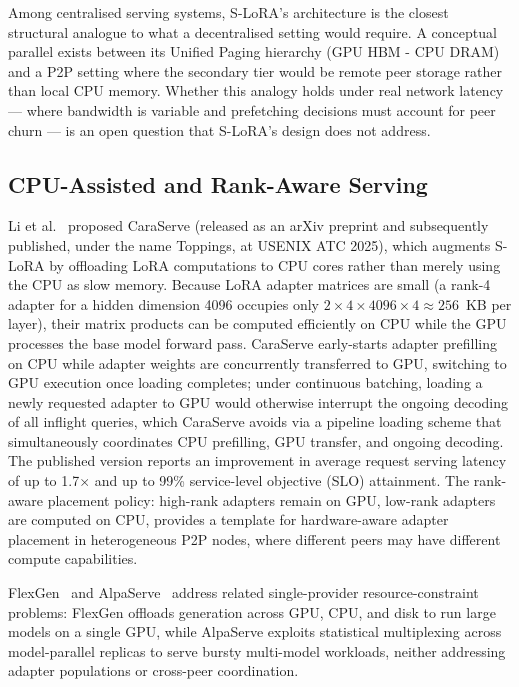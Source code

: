 Among centralised serving systems, S-LoRA's architecture is the closest structural analogue to what a decentralised setting would require. A conceptual parallel exists between its Unified Paging hierarchy (GPU HBM - CPU DRAM) and a P2P setting where the secondary tier would be remote peer storage rather than local CPU memory. Whether this analogy holds under real network latency — where bandwidth is variable and prefetching decisions must account for peer churn — is an open question that S-LoRA's design does not address.

\subsection{CPU-Assisted and Rank-Aware Serving}
\label{sec:inference_systems:cpu}

Li et al.~\cite{Li2024CaraServe} proposed CaraServe (released as an arXiv preprint and
subsequently published, under the name Toppings, at USENIX ATC 2025), which augments
S-LoRA by offloading LoRA computations to CPU cores rather than merely using the CPU as
slow memory. Because LoRA adapter matrices are small (a rank-4 adapter for a hidden
dimension 4096 occupies only $2 \times 4 \times 4096 \times 4 \approx 256$~KB per
layer), their matrix products can be computed efficiently on CPU while the GPU
processes the base model forward pass. CaraServe early-starts adapter prefilling on CPU
while adapter weights are concurrently transferred to GPU, switching to GPU execution
once loading completes; under continuous batching, loading a newly requested adapter to
GPU would otherwise interrupt the ongoing decoding of all inflight queries, which
CaraServe avoids via a pipeline loading scheme that simultaneously coordinates CPU
prefilling, GPU transfer, and ongoing decoding. The published version reports an
improvement in average request serving latency of up to 1.7$\times$ and up to 99\%
service-level objective (SLO) attainment. The rank-aware placement policy: high-rank adapters remain on GPU,
low-rank adapters are computed on CPU, provides a template for hardware-aware adapter
placement in heterogeneous P2P nodes, where different peers may have different compute
capabilities.

FlexGen~\cite{ShengFlexGen2023} and AlpaServe~\cite{LiAlpaServe2023} address related single-provider resource-constraint problems: FlexGen offloads generation across GPU, CPU, and disk to run large models on a single GPU, while AlpaServe exploits statistical multiplexing across model-parallel replicas to serve bursty multi-model workloads, neither addressing adapter populations or cross-peer coordination.

